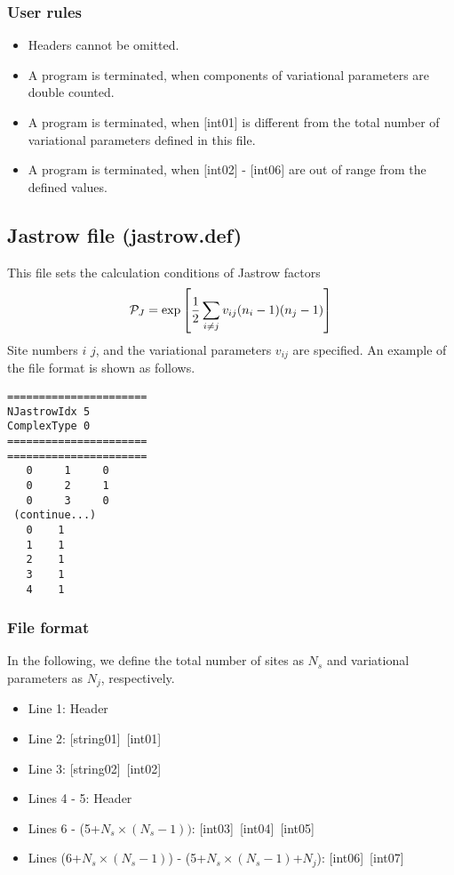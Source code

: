 \subsubsection{User rules}
\begin{itemize}
\item Headers cannot be omitted. 
\item A program is terminated, when components of variational parameters are double counted.
\item A program is terminated, when $[$int01$]$ is different from the total number of variational parameters defined in this file.
\item A program is terminated, when $[$int02$]$ - $[$int06$]$ are out of range from the defined values.
\end{itemize}

\newpage
\subsection{Jastrow file (jastrow.def)}
\label{Subsec:Jastrow}
This file sets the calculation conditions of Jastrow factors 
\begin{equation}
{\cal P}_J=\exp\left[\frac{1}{2} \sum_{i\neq j} v_{ij} (n_i-1)(n_j-1)\right]
\end{equation}
Site numbers $i$ $j$, and the variational parameters $v_{ij}$ are specified.
An example of the file format is shown as follows.

\begin{minipage}{12.5cm}
\begin{screen}
\begin{verbatim}
======================
NJastrowIdx 5  
ComplexType 0
====================== 
======================
   0     1     0 
   0     2     1 
   0     3     0 
 (continue...)
   0    1 
   1    1 
   2    1 
   3    1 
   4    1 
\end{verbatim}
\end{screen}
\end{minipage}

\subsubsection{File format}
In the following, we define the total number of sites as $N_s$ and variational parameters as $N_j$, respectively.  

 \begin{itemize}
   \item  Line 1: Header
   \item  Line 2: [string01]~[int01]
   \item  Line 3: [string02]~[int02]
   \item  Lines 4 - 5:  Header
   \item  Lines 6 - (5+$N_s\times (N_s-1))$: [int03]~[int04]~[int05]
   \item  Lines (6+$N_s\times (N_s-1)$) - (5+$N_s\times (N_s-1)$+$N_j$): [int06]~[int07]
  \end{itemize}
